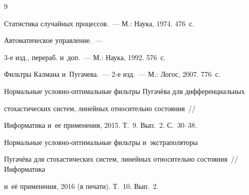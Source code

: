 {\small\frenchspacing


{%




\begin{thebibliography}{9}









Статистика случайных процессов.~--- М.: Наука, 1974. 476~с.







 Автоматическое управление.~---


3-е изд., перераб. и~доп.~--- М.: Наука, 1992. 576~с.












Фильтры Калмана и~Пугачева.~--- 2-е изд.~--- М.: Логос, 2007. 776~с.









Нормальные условно-оптимальные фильтры Пугачёва для дифференциальных


стохастических систем, линейных относительно состояния~/\!\!/


Информатика и~ее применения, 2015. Т.~9. Вып.~2. С.~30--38.









Нормальные услов\-но-оп\-ти\-маль\-ные фильтры и~экстраполяторы 


Пугачёва для стохастических систем,  линейных относительно со\-сто\-яния~/\!\!/ Информатика 


и~её применения, 2016  (в печати). Т.~10. Вып.~2.











\end{thebibliography}}}
